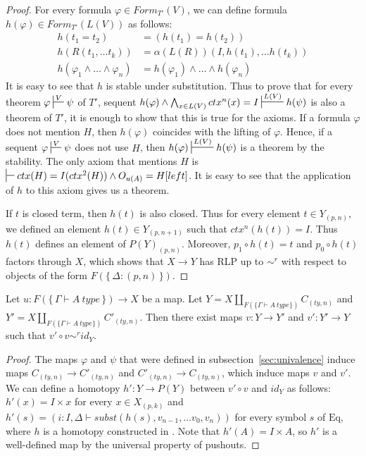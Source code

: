 \documentclass[reqno]{amsart}
\theoremstyle{definition}
\theoremstyle{remark}
\newcommand{\Eq}{\mathrm{Eq}}
\numberwithin{figure}{section}
\begin{document}
\begin{proof}
For every formula $\varphi \in Form_{T'}(V)$, we can define formula $h(\varphi) \in Form_{T'}(L(V))$ as follows:
\begin{align*}
h(t_1 = t_2) & = (h(t_1) = h(t_2)) \\
h(R(t_1, \ldots t_k)) & = \alpha(L(R))(I, h(t_1), \ldots h(t_k)) \\
h(\varphi_1 \land \ldots \land \varphi_n) & = h(\varphi_1) \land \ldots \land h(\varphi_n)
\end{align*}
It is easy to see that $h$ is stable under substitution.
Thus to prove that for every theorem $\varphi \sststile{}{V} \psi$ of $T'$, sequent $h(\varphi) \land \bigwedge_{x \in L(V)} ctx^n(x) = I \sststile{}{L(V)} h(\psi)$
is also a theorem of $T'$, it is enough to show that this is true for the axioms.
If a formula $\varphi$ does not mention $H$, then $h(\varphi)$ coincides with the lifting of $\varphi$.
Hence, if a sequent $\varphi \sststile{}{V} \psi$ does not use $H$, then $h(\varphi) \sststile{}{L(V)} h(\psi)$ is a theorem by the stability.
The only axiom that mentions $H$ is $\sststile{}{} ctx(H) = I(ctx^2(H)) \land O_{u(A)} = H[left]$.
It is easy to see that the application of $h$ to this axiom gives us a theorem.

If $t$ is closed term, then $h(t)$ is also closed.
Thus for every element $t \in Y_{(p,n)}$, we defined an element $h(t) \in Y_{(p,n+1)}$ such that $ctx^n(h(t)) = I$.
Thus $h(t)$ defines an element of $P(Y)_{(p,n)}$.
Moreover, $p_1 \circ h(t) = t$ and $p_0 \circ h(t)$ factors through $X$,
which shows that $X \to Y$ has RLP up to $\sim^r$ with respect to objects of the form $F(\{\,\Delta : (p,n)\,\})$.
\end{proof}

\begin{lem}[Jhom]
Let $u : F(\{\,\Gamma \vdash A\ type\,\}) \to X$ be a map.
Let $Y = X \amalg_{F(\{ \Gamma \vdash A\ type \})} C_{(ty,n)}$ and $Y' = X \amalg_{F(\{ \Gamma \vdash A\ type \})} C'_{(ty,n)}$.
Then there exist maps $v : Y \to Y'$ and $v' : Y' \to Y$ such that $v' \circ v \sim^r id_Y$.
\end{lem}
\begin{proof}
The maps $\varphi$ and $\psi$ that were defined in subsection~\ref{sec:univalence} induce maps $C_{(ty,n)} \to C'_{(ty,n)}$ and $C'_{(ty,n)} \to C_{(ty,n)}$, which induce maps $v$ and $v'$.
We can define a homotopy $h' : Y \to P(Y)$ between $v' \circ v$ and $id_Y$ as follows: $h'(x) = I \times x$ for every $x \in X_{(p,k)}$
and $h'(s) = (i : I, \Delta \vdash subst(h(s), v_{n-1}, \ldots v_0, v_n))$ for every symbol $s$ of $\Eq$,
where $h$ is a homotopy constructed in .
Note that $h'(A) = I \times A$, so $h'$ is a well-defined map by the universal property of pushouts.
\end{proof}
\end{document}
